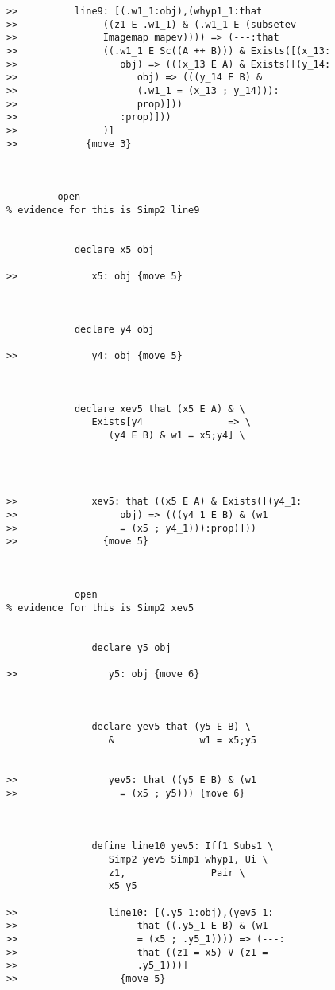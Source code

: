 \documentclass[12pt]{article}
\begin{document}
\begin{verbatim}
>>          line9: [(.w1_1:obj),(whyp1_1:that
>>               ((z1 E .w1_1) & (.w1_1 E (subsetev
>>               Imagemap mapev)))) => (---:that
>>               ((.w1_1 E Sc((A ++ B))) & Exists([(x_13:
>>                  obj) => (((x_13 E A) & Exists([(y_14:
>>                     obj) => (((y_14 E B) &
>>                     (.w1_1 = (x_13 ; y_14))):
>>                     prop)]))
>>                  :prop)]))
>>               )]
>>            {move 3}



         open
% evidence for this is Simp2 line9


            declare x5 obj

>>             x5: obj {move 5}



            declare y4 obj

>>             y4: obj {move 5}



            declare xev5 that (x5 E A) & \
               Exists[y4               => \
                  (y4 E B) & w1 = x5;y4] \
               



>>             xev5: that ((x5 E A) & Exists([(y4_1:
>>                  obj) => (((y4_1 E B) & (w1
>>                  = (x5 ; y4_1))):prop)]))
>>               {move 5}



            open
% evidence for this is Simp2 xev5


               declare y5 obj

>>                y5: obj {move 6}



               declare yev5 that (y5 E B) \
                  &               w1 = x5;y5


>>                yev5: that ((y5 E B) & (w1
>>                  = (x5 ; y5))) {move 6}



               define line10 yev5: Iff1 Subs1 \
                  Simp2 yev5 Simp1 whyp1, Ui \
                  z1,               Pair \
                  x5 y5

>>                line10: [(.y5_1:obj),(yev5_1:
>>                     that ((.y5_1 E B) & (w1
>>                     = (x5 ; .y5_1)))) => (---:
>>                     that ((z1 = x5) V (z1 =
>>                     .y5_1)))]
>>                  {move 5}




\end{verbatim}
\end{document}

